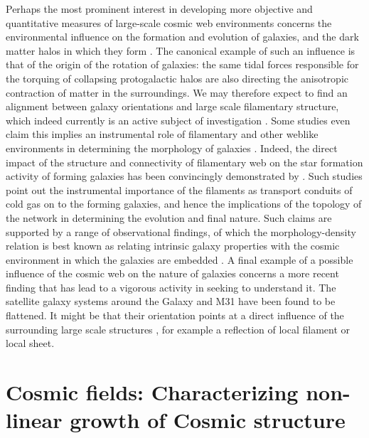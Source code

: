 Perhaps the most prominent interest in developing more objective and quantitative measures of large-scale cosmic web 
environments concerns the environmental influence on the formation and evolution of galaxies, and the dark matter 
halos in which they form \citep[see e.g.][]{Hahn2007b,Hahnphd2009,Cautun2014}. The canonical example of such 
an influence is that of the origin of the rotation of galaxies: the same tidal forces responsible for the torquing of collapsing 
protogalactic halos \citep{Hoyle1951,Peebles1969,Doroshkevich1970} are also directing the anisotropic contraction of matter in 
the surroundings. We may therefore expect to find an alignment between galaxy orientations and large scale filamentary 
structure, which indeed currently is an active subject of investigation \citep[e.g.][]{Aragon2007a,Leepen2000,Jones2010,Codis2012,Tempel2012,2013MNRAS.428.2489L,
tempel2013,Trowland2013,Trowlandphd2013,Aragon2014,2016MNRAS.457..695P,Hirv2017,2017MNRAS.464.4666G}. Some studies even claim this implies an instrumental 
role of filamentary and other weblike environments in determining 
the morphology of galaxies \citep[see e.g.][for a short review]{Pichon2016}. Indeed, the direct impact of the structure and 
connectivity of filamentary web on the star formation activity of forming galaxies has been convincingly demonstrated 
by \citet[][see also \citealt{2009ApJ...703..785D,2015MNRAS.449.2087D,2015MNRAS.454..637G,aragon2016}]{Dekel2008}. Such studies point out the instrumental importance of the filaments as transport conduits of cold 
gas on to the forming galaxies, and hence the implications of the topology of the network in determining the evolution and 
final nature. Such claims are supported by a range of observational findings, of which the morphology-density relation 
\citep{Dressler1980} is best known as relating intrinsic galaxy properties with the cosmic environment in which the 
galaxies are embedded \citep[see e.g.][]{Kuutma2017}. A final example of a possible influence of the cosmic web on the nature of 
galaxies concerns a more recent finding that has lead to a vigorous activity in seeking to understand it. The satellite galaxy 
systems around the Galaxy and M31 have been found to be flattened. It might be that their orientation points at a direct influence 
of the surrounding large scale structures \citep[see][]{Ibata2013,Cautun2015,2015MNRAS.452.1052L,Forero-Romero2015,Gonzalez2016}, for example a reflection of local filament or local sheet.


\section{Cosmic fields: Characterizing non-linear growth of Cosmic structure}


